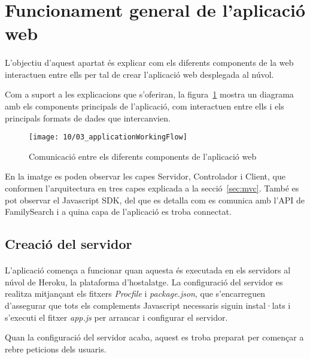 \section{Funcionament general de l'aplicació web}

    \paragraph{}
    L'objectiu d'aquest apartat és explicar com els diferents components de la web interactuen entre ells per tal de crear l'aplicació web desplegada al núvol.

    Com a suport a les explicacions que s'oferiran, la figura~\ref{img:appWorkflow} mostra un diagrama amb els components principals de l'aplicació, com interactuen entre ells i els principals formats de dades que intercanvien.

    \begin{figure}
        \texttt{[image: 10/03\_applicationWorkingFlow]}
        \centering
        \caption{Comunicació entre els diferents components de l'aplicació web}\label{img:appWorkflow}
    \end{figure}

    En la imatge es poden observar les capes Servidor, Controlador i Client, que conformen l'arquitectura en tres capes explicada a la secció~\ref{sec:mvc}. També es pot observar el Javascript SDK, del que es detalla com es comunica amb l'API de FamilySearch i a quina capa de l'aplicació es troba connectat.


    \subsection{Creació del servidor}

    \paragraph{}
    L'aplicació comença a funcionar quan aquesta és executada en els servidors al núvol de Heroku, la plataforma d'hostalatge. La configuració del servidor es realitza mitjançant els fitxers \emph{Procfile} i \emph{package.json}, que s'encarreguen d'assegurar que tots els complements Javascript necessaris siguin instal·lats i s'executi el fitxer \emph{app.js} per arrancar i configurar el servidor.

    Quan la configuració del servidor acaba, aquest es troba preparat per començar a rebre peticions dels usuaris.


